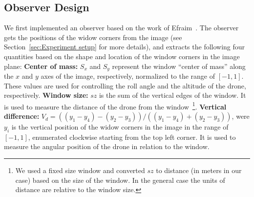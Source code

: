 \documentclass{sig-alternate-ipsn13}
\newtheorem{remark}{Remark}
\begin{document}
\subsection{Observer Design}
\label{sec:Observer Design}
We first implemented an observer based on the work of Efraim~\cite{Efraim17}. The observer gets the positions of the widow corners from the image (see Section~\ref{sec:Experiment setup} for more details), %
and extracts the following four quantities based on the shape and location of the window corners in the image plane: %
\textbf{Center of mass:} $S_x$ and $S_y$ represent the window ``center of mass'' along the $x$ and $y$ axes of the image, respectively, normalized to the range of $[-1,1]$.
These values are used for controlling the roll angle and the altitude of the drone, respectively. 
\textbf{Window size:} $sz$ is the sum of the vertical edges of the window. It is used to measure the distance of the drone from the window~\footnote{We used a fixed size window and converted $sz$ to distance (in meters in our case) based on the size of the window. In the general case the units of distance are relative to the window size.}.
\textbf{Vertical difference:} $V_d = {((y_1-y_4)-(y_2-y_3))}/{((y_1-y_4)+(y_2-y_3))}$, were $y_i$ is the vertical position of the widow corners in the image in the range of $[-1,1]$, enumerated clockwise starting from the top left corner. It is used to measure the angular position of the drone in relation to the window. %

\end{document}

